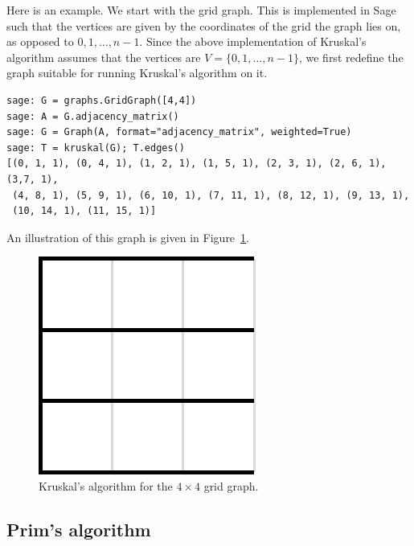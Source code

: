 Here is an example. We start with the grid
graph. This is implemented in Sage such that the vertices are given by
the coordinates of the grid the graph lies on, as opposed to
$0, 1, \dots, n-1$. Since the above implementation of
Kruskal's algorithm assumes that the
vertices are $V = \{0, 1, \dots, n-1\}$, we first redefine the graph
suitable for running Kruskal's algorithm on
it.
\begin{lstlisting}
sage: G = graphs.GridGraph([4,4])
sage: A = G.adjacency_matrix()
sage: G = Graph(A, format="adjacency_matrix", weighted=True)
sage: T = kruskal(G); T.edges()
[(0, 1, 1), (0, 4, 1), (1, 2, 1), (1, 5, 1), (2, 3, 1), (2, 6, 1), (3,7, 1),
 (4, 8, 1), (5, 9, 1), (6, 10, 1), (7, 11, 1), (8, 12, 1), (9, 13, 1),
 (10, 14, 1), (11, 15, 1)]
\end{lstlisting}
An illustration of this graph is given in
Figure~\ref{fig:trees-forests:Kruskal_example}.

\begin{figure}[!htbp]
\centering
{}
\includegraphics{image/trees-forests/Kruskal-example}
\caption{Kruskal's algorithm for the $4 \times 4$ grid graph.}
\label{fig:trees-forests:Kruskal_example}
\end{figure}



\subsection{Prim's algorithm}
\label{subsec:trees_forests:Prim_algorithm}

